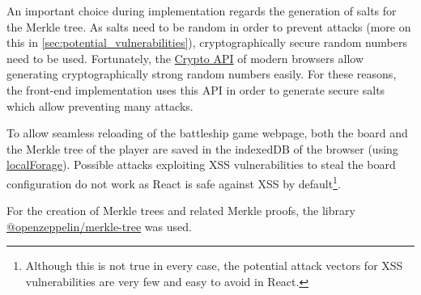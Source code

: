 An important choice during implementation regards the generation of salts for
the Merkle tree. As salts need to be random in order to prevent attacks (more
on this in \cref{sec:potential_vulnerabilities}), cryptographically secure
random numbers need to be used. Fortunately, the
\href{https://developer.mozilla.org/en-US/docs/Web/API/Crypto}{\color{blue}Crypto
	API} of modern browsers allow generating cryptographically strong random
numbers easily. For these reasons, the front-end implementation uses this API
in order to generate secure salts which allow preventing many attacks.

To allow seamless reloading of the battleship game webpage, both the board and
the Merkle tree of the player are saved in the indexedDB of the browser (using
\href{https://github.com/localForage/localForage}{\color{blue}localForage}).
Possible attacks exploiting XSS vulnerabilities to steal the board
configuration do not work as React is safe against XSS by
default\footnote{Although this is not true in every case, the potential attack
	vectors for XSS vulnerabilities are very few and easy to avoid in React.}.

For the creation of Merkle trees and related Merkle proofs, the library
\href{https://github.com/OpenZeppelin/merkle-tree}{\color{blue}@openzeppelin/merkle-tree}
was used.

